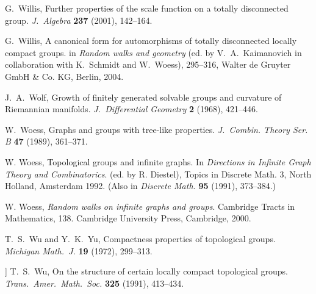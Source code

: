 \documentclass{emsprocart}
\theoremstyle{definition}
\begin{document}
\begin{thebibliography}{99}
 G.\ Willis,
                Further properties of the scale function on a totally
                disconnected group.
                {\em J.~Algebra} {\bf 237} (2001), 142--164.

 G.\ Willis,
                A canonical form for automorphisms of totally
                disconnected locally compact groups.
                in {\em Random walks and geometry}
                (ed. by V.~A.~Kaimanovich
                 in collaboration with K.~Schmidt and W.~Woess),
                295--316, Walter de Gruyter GmbH \& Co. KG,
                Berlin, 2004.

 J.~A.~Wolf,
               Growth of finitely generated solvable groups and
               curvature of Riemannian manifolds.
               {\em J.~Differential Geometry} {\bf 2} (1968),
               421--446.

 W.~Woess,
                Graphs and groups with tree-like properties.
                                {\em J.~Combin. Theory Ser. B} {\bf 47} (1989),
                361--371.

 W. Woess,
                Topological groups and infinite graphs.  In
                {\em Directions in Infinite Graph Theory and
                Combinatorics}. (ed. by R. Diestel), Topics in Discrete
                Math. 3, North Holland, Amsterdam 1992.
                (Also in {\em Discrete Math.}  {\bf 95} (1991), 373--384.)

 W. Woess,
              {\em Random walks on infinite graphs and
              groups}.  Cambridge Tracts in Mathematics, 138. Cambridge
              University Press, Cambridge, 2000.

 T.\ S.~Wu and Y.\ K.\ Yu,
               Compactness properties of topological groups.
               {\em Michigan Math.\ J.} {\bf 19} (1972), 299--313.

] T.\ S.~Wu,
                On the structure of certain locally compact topological groups.
                {\em Trans.\ Amer.\ Math.\ Soc.}  {\bf 325} (1991),
                413--434.

\end{thebibliography}
\end{document}
